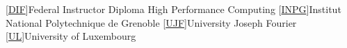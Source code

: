 \documentclass{cv}
\begin{document}
\begin{acronym}
    [\href{http://www.ffkama.fr/direction-technique/formation/formationsfederales.php}{DIF}]{Federal Instructor Diploma}
     {High Performance Computing}
    [\href{http://www.grenoble-inp.fr/}{INPG}]{Institut National Polytechnique de Grenoble}
    [\href{http://www.ujf-grenoble.fr/}{UJF}]{University Joseph Fourier}
    [\href{http://www.uni.lu}{UL}]{University of Luxembourg}
\end{acronym}
\end{document}
